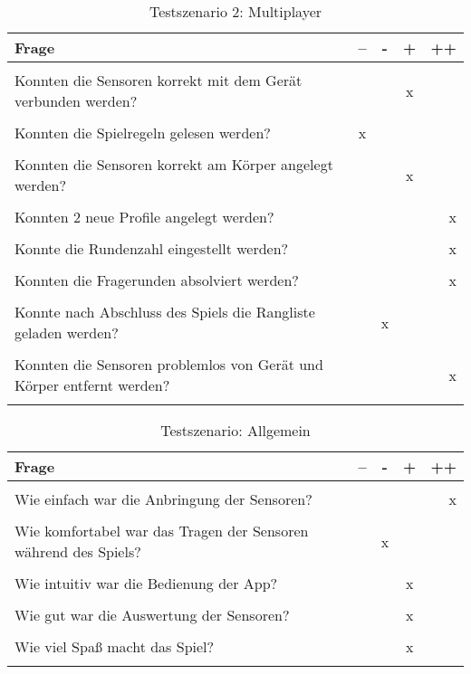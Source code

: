 \begin{table}[h!tp]
	\begin{center}
		\begin{tabular}{@{}|l|c|c|c|r|@{}}
			\hline
			Frage & -- & - & + & ++ \\
			\hline
			 & & & & \\
			Konnten die Sensoren korrekt mit dem Gerät verbunden werden? & & & x & \\
			 & & & & \\
			Konnten die Spielregeln gelesen werden? & x & & & \\
			 & & & & \\
			Konnten die Sensoren korrekt am Körper angelegt werden? & & & x & \\
			 & & & & \\
			Konnten 2 neue Profile angelegt werden? & & & & x \\
			 & & & & \\
			Konnte die Rundenzahl eingestellt werden? & & & & x \\
			 & & & & \\
			Konnten die Fragerunden absolviert werden? & & & & x \\
			 & & & & \\
			Konnte nach Abschluss des Spiels die Rangliste geladen werden? & & x & & \\
			 & & & & \\
			Konnten die Sensoren problemlos von Gerät und Körper entfernt werden? & & & & x \\
			 & & & & \\
			\hline
		\end{tabular}
	\end{center}
	\caption{Testszenario 2: Multiplayer}
	\label{tab_test_multiplayer}
\end{table}

\begin{table}[h!tp]
	\begin{center}
		\begin{tabular}{@{}|l|c|c|c|r|@{}}
			\hline
			Frage & -- & - &  + & ++ \\
			\hline
			 & & & & \\
			Wie einfach war die Anbringung der Sensoren? & & & & x \\
			 & & & & \\
			Wie komfortabel war das Tragen der Sensoren während des Spiels? & & x & & \\
			 & & & & \\
			Wie intuitiv war die Bedienung der App? & & & x & \\
			 & & & & \\
			Wie gut war die Auswertung der Sensoren? & & & x & \\
			 & & & & \\
			Wie viel Spaß macht das Spiel? & & & x & \\
			 & & & & \\
			\hline
		\end{tabular}
	\end{center}
	\caption{Testszenario: Allgemein}
	\label{tab_test_allgemein}
\end{table}